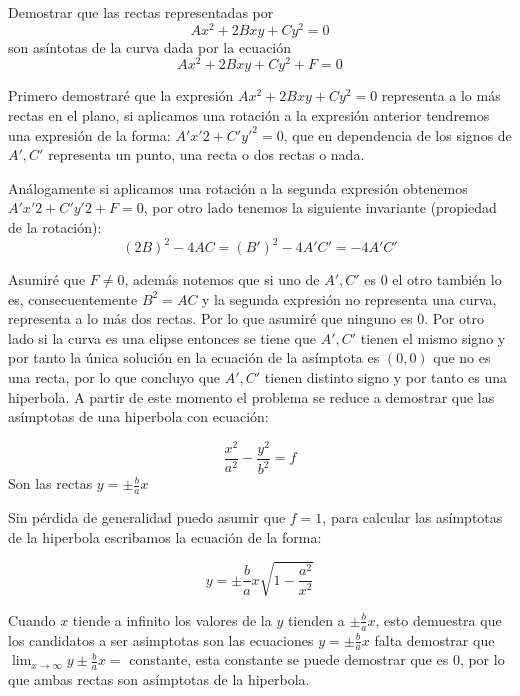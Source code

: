 \documentclass[14pt]{extarticle}
\begin{document}
\begin{tcolorbox}[colback=blue!5!white,colframe=blue!75!black, title = Motivación]

    Demostrar que las rectas representadas por $$Ax^2 + 2Bxy + Cy^2 = 0$$ son asíntotas de la curva
dada por la ecuación $$Ax^2 + 2Bxy + Cy^2 + F = 0$$

\end{tcolorbox}

\begin{tcolorbox}[colback=red!5!white,colframe=red!75!black, title = Solución]

    Primero demostraré que la expresión $Ax^2 + 2Bxy + Cy^2 = 0$ representa a lo más rectas en el plano, si aplicamos una rotación a la expresión anterior tendremos una expresión de la forma: $A'x'2+C'y'^2 = 0$, que en dependencia de los signos de $A', C'$ representa un punto, una recta o dos rectas o nada.

    Análogamente si aplicamos una rotación a la segunda expresión obtenemos $A'x'2+C'y'2 + F = 0$, por otro lado tenemos la siguiente invariante (propiedad de la rotación): 
    $$
        (2B)^2-4AC = (B')^2-4A'C' = -4A'C'
    $$

    Asumiré que $F \neq 0$, además notemos que si uno de $A', C'$ es $0$ el otro también lo es, consecuentemente $B^2 = AC$ y la segunda expresión no representa una curva, representa a lo más dos rectas. Por lo que asumiré que ninguno es $0$. Por otro lado si la curva es una elipse entonces se tiene que $A',C'$ tienen el mismo signo y por tanto la única solución en la ecuación de la asímptota es $(0,0)$ que no es una recta, por lo que concluyo que $A',C'$ tienen distinto signo y por tanto es una hiperbola. A partir de este momento el problema se reduce a demostrar que las asímptotas de una hiperbola con ecuación:
    
$$\frac{x^2}{a^2} - \frac{y^2}{b^2} = f$$ Son las rectas $y = \pm \frac{b}{a}x$
\end{tcolorbox}

\newpage

Sin pérdida de generalidad puedo asumir que $f = 1$, para calcular las asímptotas de la hiperbola escribamos la ecuación de la forma:

$$y = \pm \frac{b}{a}x \sqrt{1 - \frac{a^2}{x^2}}$$

Cuando $x$ tiende a infinito los valores de la $y$ tienden a $\pm \frac{b}{a}x$, esto demuestra que los candidatos a ser asimptotas son las ecuaciones $y = \pm \frac{b}{a}x$ falta demostrar que $\lim_{x \to \infty} y \pm \frac{b}{a}x = $ constante, esta constante se puede demostrar que es $0$, por lo que ambas rectas son asímptotas de la hiperbola.
\end{document}
